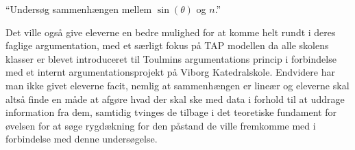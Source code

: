 \begin{center}
``Undersøg sammenhængen mellem $\sin(\theta)$ og $n$.''
\end{center}
Det ville også give eleverne en bedre mulighed for at komme helt rundt i deres faglige argumentation, med et særligt fokus på TAP modellen da alle skolens klasser er blevet introduceret til Toulmins argumentations princip i forbindelse med et internt  argumentationsprojekt på Viborg Katedralskole. Endvidere har man ikke givet eleverne facit, nemlig at sammenhængen er lineær og eleverne skal altså finde en måde at afgøre hvad der skal ske med data i forhold til at uddrage information fra dem, samtidig tvinges de tilbage i det teoretiske fundament for øvelsen for at søge rygdækning for den påstand de ville fremkomme med i forbindelse med denne undersøgelse. 

